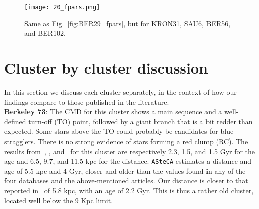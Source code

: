 \documentclass{aa}
\begin{document}
\begin{appendix}
 \begin{figure*}
  \centering
  \texttt{[image: 20\_fpars.png]}
  \caption{Same as Fig.~\ref{fig:BER29_fpars}, but  for KRON31, SAU6, BER56, and BER102.}
  \label{fig:20fpars}
 \end{figure*}


\FloatBarrier
\section{Cluster by cluster discussion}
 \label{app:indiv_clusters}

  In this section we discuss each cluster separately, in the context of how our
  findings compare to those published in the literature.\\

  \noindent \textbf{Berkeley 73}: The CMD for this cluster shows a main sequence
  and a well-defined turn-off (TO) point, followed by a giant branch
  that is a bit redder than expected. Some stars above the TO could probably be
  candidates for blue stragglers. There is no strong evidence of stars forming a
  red clump (RC).
  The results from~\cite{Ortolani_2005}, \cite{Carraro_2005},
  and~\cite{Carraro_2007_oldOC} for this cluster are respectively 2.3, 1.5, and 1.5 Gyr for the age and
  6.5, 9.7, and 11.5 kpc for the  distance.
  \texttt{ASteCA} estimates a distance and age of 5.5 kpc and 4 Gyr,
  closer and older than the values found in any of the four databases and the
  above-mentioned articles. Our distance is closer to that reported
  in~\cite{Dias_2021} of 5.8 kpc, with an age of 2.2 Gyr. This is thus a
  rather old cluster, located well below the 9 Kpc limit.\\


\end{appendix}
\end{document}
